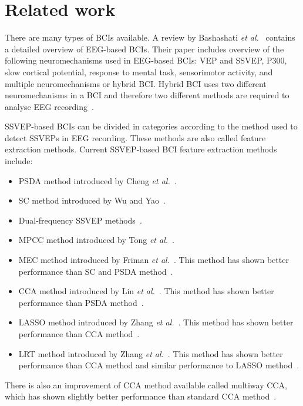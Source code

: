 \section{Related work}

There are many types of \glspl{BCI} available. A review by Bashashati \textit{et al.}~\cite{bci_comparison} contains a detailed overview of \gls{EEG}-based \glspl{BCI}. Their paper includes overview of the following neuromechanisms used in \gls{EEG}-based \glspl{BCI}: \gls{VEP} and \gls{SSVEP}, P300, slow cortical potential, response to mental task, sensorimotor activity, and multiple neuromechanisms or hybrid \gls{BCI}. Hybrid \gls{BCI} uses two different neuromechanisms in a \gls{BCI} and therefore two different methods are required to analyse \gls{EEG} recording~\cite{hybrid_bci, hybrid_bci2}. %

\gls{SSVEP}-based \glspl{BCI} can be divided in categories according to the method used to detect \glspl{SSVEP} in \gls{EEG} recording. These methods are also called \gls{feature extraction} methods. Current \gls{SSVEP}-based \gls{BCI} \gls{feature extraction} methods include:
\begin{itemize}
	\item \Gls{PSDA} method introduced by Cheng \textit{et al.}~\cite{psda}.
	\item \Gls{SC} method introduced by Wu and Yao~\cite{sc}.
	\item Dual-frequency \gls{SSVEP} methods~\cite{dual1, dual2}.
	\item \Gls{MPCC} method introduced by Tong \textit{et al.}~\cite{MPCC}.
	\item \Gls{MEC} method introduced by Friman \textit{et al.}~\cite{mec}. This method has shown better performance than \gls{SC} and \gls{PSDA} method~\cite{mec_comparison}.
	\item \Gls{CCA} method introduced by Lin \textit{et al.}~\cite{cca_lin}. This method has shown better performance than \gls{PSDA} method~\cite{cca_psda, bin2009cca, cca_lin}.
	\item \Gls{LASSO} method introduced by Zhang \textit{et al.}~\cite{LASSO}. This method has shown better performance than \gls{CCA} method~\cite{LASSO}.
	\item \Gls{LRT} method introduced by Zhang \textit{et al.}~\cite{LRT}. This method has shown better performance than \gls{CCA} method and similar performance to \gls{LASSO} method~\cite{LRT}.
\end{itemize}
There is also an improvement of \gls{CCA} method available called multiway \gls{CCA}, which has shown slightly better performance than standard \gls{CCA} method~\cite{mcca}.

